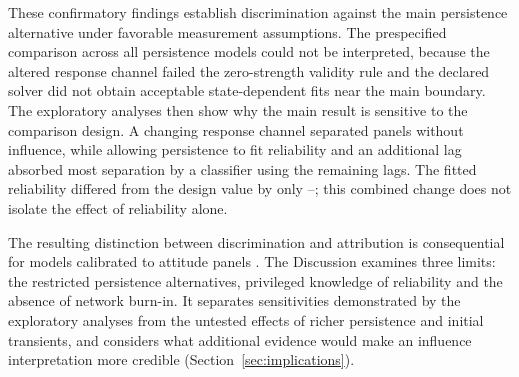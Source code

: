 These confirmatory findings establish discrimination against the main persistence alternative under favorable measurement assumptions. The prespecified comparison across all persistence models could not be interpreted, because the altered response channel failed the zero-strength validity rule and the declared solver did not obtain acceptable state-dependent fits near the main boundary. The exploratory analyses then show why the main result is sensitive to the comparison design. A changing response channel separated panels without influence, while allowing persistence to fit reliability and an additional lag absorbed most separation by a classifier using the remaining lags. The fitted reliability differed from the design value by only --; this combined change does not isolate the effect of reliability alone.

The resulting distinction between discrimination and attribution is consequential for models calibrated to attitude panels \cite{manski1993,shalizi2011,cohencole2008}. The Discussion examines three limits: the restricted persistence alternatives, privileged knowledge of reliability and the absence of network burn-in. It separates sensitivities demonstrated by the exploratory analyses from the untested effects of richer persistence and initial transients, and considers what additional evidence would make an influence interpretation more credible (Section~\ref{sec:implications}).
